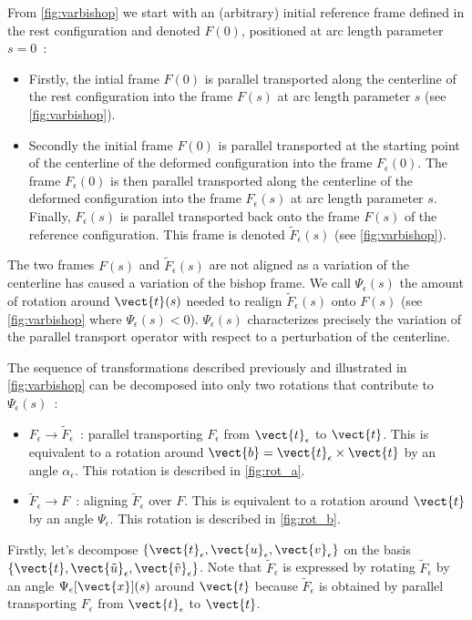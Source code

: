 From \cref{fig:varbishop} we start with an (arbitrary) initial reference frame defined in the rest configuration and denoted $F(0)$, positioned at arc length parameter $s=0$~:
\begin{itemize}
\item
Firstly, the intial frame $F(0)$ is parallel transported along the centerline of the rest configuration into the frame $F(s)$ at arc length parameter $s$ (see \cref{fig:varbishop}).
\item
Secondly the initial frame $F(0)$ is parallel transported at the starting point of the centerline of the deformed configuration into the frame $F_{\epsilon}(0)$. The frame $F_{\epsilon}(0)$ is then parallel transported along the centerline of the deformed configuration into the frame $F_{\epsilon}(s)$ at arc length parameter $s$. Finally, $F_{\epsilon}(s)$ is parallel transported back onto the frame $F(s)$ of the reference configuration. This frame is denoted $\tilde{F}_\epsilon(s)$ (see \cref{fig:varbishop}).
\end{itemize}
The two frames $F(s)$ and $\tilde{F}_\epsilon(s)$ are not aligned as a variation of the centerline has caused a variation of the bishop frame. We call $\Psi_\epsilon(s)$ the amount of rotation around $\vect{t}(s)$ needed to realign $\tilde{F}_\epsilon(s)$ onto $F(s)$ (see \cref{fig:varbishop} where $\Psi_\epsilon(s) < 0$). $\Psi_\epsilon(s)$ characterizes precisely the variation of the parallel transport operator with respect to a perturbation of the centerline.

The sequence of transformations described previously and illustrated in \cref{fig:varbishop} can be decomposed into only two rotations that contribute to $\Psi_\epsilon(s)$~:
\begin{itemize}
\item
$F_\epsilon \rightarrow \tilde{F}_\epsilon$~: parallel transporting $F_\epsilon$ from $\vect{t}_\epsilon$ to $\vect{t}$.
This is equivalent to a rotation around $\vect{b} = \vect{t}_\epsilon \times \vect{t}$ by an angle $\alpha_\epsilon$. This rotation is described in \cref{fig:rot_a}.
\item
$\tilde{F}_\epsilon \rightarrow F$~: aligning $\tilde{F}_\epsilon$ over $F$. This is equivalent to a rotation around $\vect{t}$ by an angle $\Psi_\epsilon$. This rotation is described in \cref{fig:rot_b}.
\end{itemize}
Firstly, let's decompose $\{\vect{t}_\epsilon, \vect{u}_\epsilon,\vect{v}_\epsilon\}$ on the basis $\{\vect{t}, \vect{\tilde{u}}_\epsilon,\vect{\tilde{v}}_\epsilon\}$. Note that $\tilde{F}_\epsilon$ is expressed by rotating $\tilde{F}_\epsilon$ by an angle $\Psi_\epsilon[\vect{x}](s)$ around $\vect{t}$ because $\tilde{F}_\epsilon$ is obtained by parallel transporting $F_\epsilon$ from $\vect{t}_\epsilon$ to $\vect{t}$.




